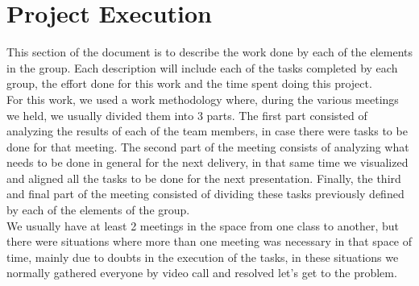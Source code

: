 \newpage

\section{Project Execution}

\quad This section of the document is to describe the work done by each of the elements in the group. Each description will include each of the tasks completed by each group, the effort done for this work and the time spent doing this project.\\

For this work, we used a work methodology where, during the various meetings we held, we usually divided them into 3 parts. The first part consisted of analyzing the results of each of the team members, in case there were tasks to be done for that meeting. The second part of the meeting consists of analyzing what needs to be done in general for the next delivery, in that same time we visualized and aligned all the tasks to be done for the next presentation. Finally, the third and final part of the meeting consisted of dividing these tasks previously defined by each of the elements of the group.\\

We usually have at least 2 meetings in the space from one class to another, but there were situations where more than one meeting was necessary in that space of time, mainly due to doubts in the execution of the tasks, in these situations we normally gathered everyone by video call and resolved let's get to the problem. \\





